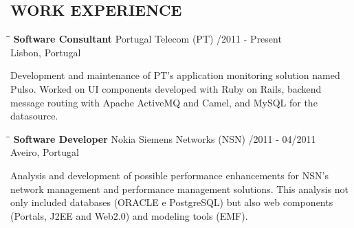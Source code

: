 \documentclass{res}
\begin{document}
                               				         
\address{\bf  PRESENT ADDRESS\\Places and stuff\\cities and the like\\(351) 55
555 555} \address{\bf PERMANENT ADDRESS\\Home town\\ home city\\  (351) 55 555
5555}
                               				               


\begin{resume}

\section{WORK EXPERIENCE}

\vspace{-0.1in}
\begin{tabbing}
\hspace{2.3in}\= \hspace{2.6in}\= \kill %
{\bf Software Consultant} \>Portugal Telecom (PT)     /2011 - Present\\
\>Lisbon, Portugal
\end{tabbing}\vspace{-20pt}      %
Development and maintenance of PT's application monitoring solution named Pulso.
Worked on UI components developed with Ruby on Rails, backend message
routing with Apache ActiveMQ and Camel, and MySQL for the datasource.

\begin{tabbing}
\hspace{2.3in}\= \hspace{2.6in}\= \kill %
{\bf Software Developer} \>Nokia Siemens Networks (NSN)    
/2011 - 04/2011\\ \>Aveiro, Portugal
\end{tabbing}\vspace{-20pt}      %
Analysis and development of possible performance enhancements for NSN's
network management and performance management solutions. This analysis not only
included databases (ORACLE e PostgreSQL) but also web components (Portals, J2EE
and Web2.0) and modeling tools (EMF).


\end{resume}
\end{document}
